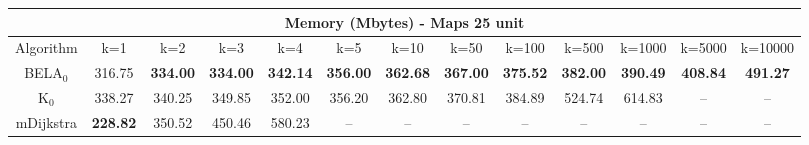 \begin{tabular}{c|cccccccccccc}\toprule
\multicolumn{13}{c}{Memory (Mbytes) - Maps 25 unit}\\ \midrule
Algorithm & k=1 & k=2 & k=3 & k=4 & k=5 & k=10 & k=50 & k=100 & k=500 & k=1000 & k=5000 & k=10000 \\ \midrule
BELA$_0$ & 316.75 & \textbf{334.00} & \textbf{334.00} & \textbf{342.14} & \textbf{356.00} & \textbf{362.68} & \textbf{367.00} & \textbf{375.52} & \textbf{382.00} & \textbf{390.49} & \textbf{408.84} & \textbf{491.27} \\
K$_0$ & 338.27 & 340.25 & 349.85 & 352.00 & 356.20 & 362.80 & 370.81 & 384.89 & 524.74 & 614.83 & -- & -- \\
mDijkstra & \textbf{228.82} & 350.52 & 450.46 & 580.23 & -- & -- & -- & -- & -- & -- & -- & -- \\ \bottomrule 
\end{tabular}

